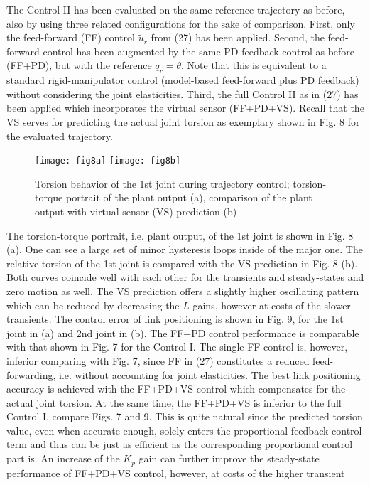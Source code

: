 \documentclass[a4paper, 10pt, conference]{ieeeconf}
\begin{document}
The Control II has been evaluated on the same reference trajectory
as before, also by using three related configurations for the sake
of comparison. First, only the feed-forward (FF) control
$\tilde{u}_r$ from (27) has been applied. Second, the feed-forward
control has been augmented by the same PD feedback control as
before (FF+PD), but with the reference $q_{r} = \theta $. Note
that this is equivalent to a standard rigid-manipulator control
(model-based feed-forward plus PD feedback) without considering
the joint elasticities. Third, the full Control II as in (27) has
been applied which incorporates the virtual sensor (FF+PD+VS).
Recall that the VS serves for predicting the actual joint torsion
as exemplary shown in Fig. 8 for the evaluated trajectory.
\begin{figure}[!h]
\centering
\texttt{[image: fig8a]}
\texttt{[image: fig8b]}
\caption{Torsion behavior of the 1st joint during trajectory
control; torsion-torque portrait of the plant output (a),
comparison of the plant output with virtual sensor (VS) prediction
(b)} \label{fig:Control2_Hyst}
\end{figure}
The torsion-torque portrait, i.e. plant output, of the 1st joint
is shown in Fig. 8 (a). One can see a large set of minor
hysteresis loops inside of the major one. The relative torsion of
the 1st joint is compared with the VS prediction in Fig. 8 (b).
Both curves coincide well with each other for the transients and
steady-states and zero motion as well. The VS prediction offers a
slightly higher oscillating pattern which can be reduced by
decreasing the $L$ gains, however at costs of the slower
transients. The control error of link positioning is shown in Fig.
9, for the 1st joint in (a) and 2nd joint in (b). The FF+PD
control performance is comparable with that shown in Fig. 7 for
the Control I. The single FF control is, however, inferior
comparing with Fig. 7, since FF in (27) constitutes a reduced
feed-forwarding, i.e. without accounting for joint elasticities.
The best link positioning accuracy is achieved with the FF+PD+VS
control which compensates for the actual joint torsion. At the
same time, the FF+PD+VS is inferior to the full Control I, compare
Figs. 7 and 9. This is quite natural since the predicted torsion
value, even when accurate enough, solely enters the proportional
feedback control term and thus can be just as efficient as the
corresponding proportional control part is. An increase of the
$K_{p}$ gain can further improve the steady-state performance of
FF+PD+VS control, however, at costs of the higher transient
\end{document}
